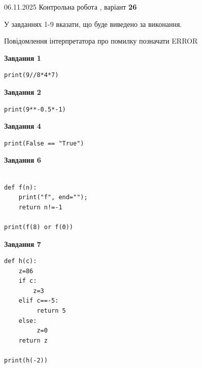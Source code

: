 \documentclass[12pt, ukrainian]{article}
\begin{document}
{\Large{06.11.2025 Контрольна робота , варіант  \No \textbf { 26 }\par}}
{
\begin {large}
У завданнях 1-9 вказати, що буде виведено за виконання.

Повідомлення інтерпретатора про помилку позначати ERROR

\begin{minipage}[t]{7.5cm}

\begin{center}
\textbf{Завдання 1}
\end{center}

\begin{verbatim}
print(9//8*4*7)
\end{verbatim}



\begin{center}
\textbf{Завдання 2}
\end{center}

\begin{verbatim}
print(9**-0.5*-1)
\end{verbatim}



\begin{center}
\textbf{Завдання 4}
\end{center}

\begin{verbatim}
print(False == "True")
\end{verbatim}



\begin{center}
\textbf{Завдання 6}
\end{center}

\begin{verbatim}

def f(n):
    print("f", end="");
    return n!=-1

print(f(8) or f(0))
\end{verbatim}



\begin{center}
\textbf{Завдання 7}
\end{center}

\begin{verbatim}
def h(c):
    z=86
    if c: 
        z=3
    elif c==-5:
         return 5
    else:
         z=0
    return z

print(h(-2))
\end{verbatim}


\end{minipage}
\end{large}}
\end{document}
